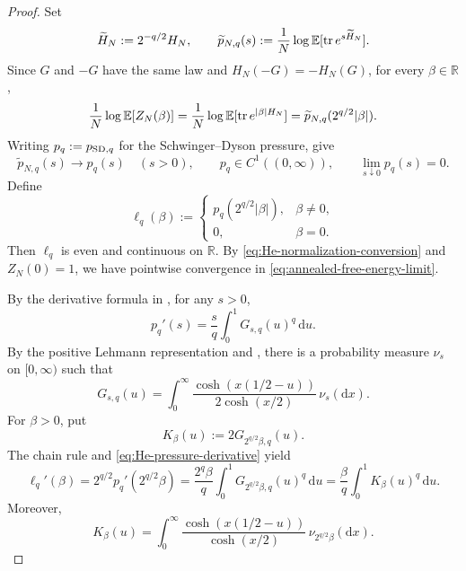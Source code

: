 \documentclass[../CLT_SYK.tex]{subfiles}
\begin{document}
\begin{proof}
    Set
    \begin{equation*}
        \widetilde{H}_N:=2^{-q/2}H_N,
        \qquad
       {\widetilde{p}_{N,q}(s)}:=\frac1N\log\mathbb E[\operatorname{tr} e^{s\widetilde{H}_N}].
    \end{equation*}
    Since $G$ and $-G$ have the
    same law and $H_N(-G)=-H_N(G)$, for every $\beta\in\mathbb R$,
    \begin{equation} \label{eq:He-normalization-conversion}
        \frac1N\log\mathbb E[Z_N(\beta)]
        =\frac1N\log\mathbb E[\operatorname{tr} e^{|\beta|H_N}]
        =\widetilde{p}_{N,q}(2^{q/2}|\beta|).
    \end{equation}
    Writing $p_q:=p_{{\rm SD},q}$ for the Schwinger--Dyson pressure, \cite[Theorem~1.1 and Proposition~3.3]{He2026} give
    \begin{equation*}
        \widetilde{p}_{N,q}(s)\longrightarrow p_q(s)
        \quad (s>0),
        \qquad
        p_q\in C^1((0,\infty)),
        \qquad
        \lim_{s\downarrow0}p_q(s)=0.
    \end{equation*}
    Define
    \begin{equation*}
        \ell_q(\beta):=
        \begin{cases}
            p_q(2^{q/2}|\beta|),&\beta\neq0,\\
            0,&\beta=0.
        \end{cases}
    \end{equation*}
    Then $\ell_q$ is even and continuous on $\mathbb R$. By \eqref{eq:He-normalization-conversion} and  $Z_N(0)=1$, we have pointwise convergence in \eqref{eq:annealed-free-energy-limit}.

    By the derivative formula in \cite[Proposition 3.3]{He2026}, for any $s>0$, 
    \begin{equation} \label{eq:He-pressure-derivative}
        p_q'(s)=\frac{s}{q}\int_0^1G_{s,q}(u)^q\,\mathrm du.
    \end{equation}
    By the positive Lehmann representation and
    \cite[Theorem~2.5]{He2026}, there is a probability measure $\nu_s$
    on $[0,\infty)$ such that
    \begin{equation*}
        G_{s,q}(u)
        =\int_0^\infty
        \frac{\cosh(x(1/2-u))}{2\cosh(x/2)}\,\nu_s(\mathrm dx).
    \end{equation*}
    For $\beta>0$, put
    \begin{equation*}
        K_\beta(u):=2G_{2^{q/2}\beta,q}(u).
    \end{equation*}
    The chain rule and
    \eqref{eq:He-pressure-derivative} yield
    \begin{equation} \label{eq:ell-kernel-derivative}
        \ell_q'(\beta)
        =2^{q/2}p_q'(2^{q/2}\beta)
        =\frac{2^q\beta}{q}\int_0^1G_{2^{q/2}\beta,q}(u)^q\,\mathrm du
        =\frac\beta q\int_0^1K_\beta(u)^q\,\mathrm du.
    \end{equation}
    Moreover,
    \begin{equation} \label{eq:ell-kernel-representation}
        K_\beta(u)
        =\int_0^\infty
        \frac{\cosh(x(1/2-u))}{\cosh(x/2)}\,\nu_{2^{q/2}\beta}(\mathrm dx).
    \end{equation}


\end{proof}
\end{document}
